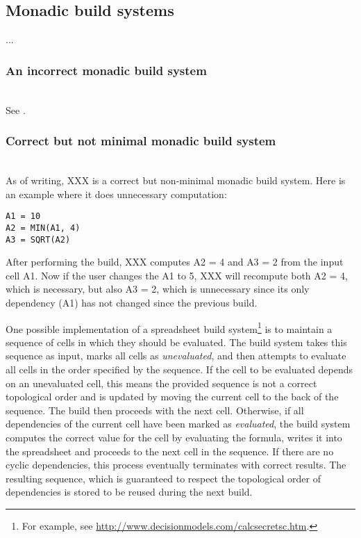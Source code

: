 

\subsection{Monadic build systems}

...
\subsubsection{An incorrect monadic build system}~\\

See .

\subsubsection{Correct but not minimal monadic build system}~\\

As of writing, XXX is a correct but non-minimal monadic build system. Here is
an example where it does unnecessary computation:

\begin{verbatim}
A1 = 10
A2 = MIN(A1, 4)
A3 = SQRT(A2)
\end{verbatim}

After performing the build, XXX computes \textsf{A2 = 4} and \textsf{A3 = 2}
from the input cell \textsf{A1}. Now if the user changes the \textsf{A1} to 5,
XXX will recompute both \textsf{A2 = 4}, which is necessary, but also
\textsf{A3 = 2}, which is unnecessary since its only dependency (\textsf{A1})
has not changed since the previous build.

One possible implementation of a spreadsheet build
system\footnote{For example, see \url{http://www.decisionmodels.com/calcsecretsc.htm}.}
is to maintain a
sequence of cells in which they should be evaluated. The build system takes this
sequence as input, marks all cells as \emph{unevaluated}, and then attempts to
evaluate all cells in the order specified by the sequence. If the cell to be
evaluated depends on an unevaluated cell, this means the provided sequence is
not a correct topological order and is updated by moving the current cell to the
back of the sequence. The build then proceeds with the next cell. Otherwise, if
all dependencies of the current cell have been marked as \emph{evaluated}, the
build system computes the correct value for the cell by evaluating the formula,
writes it into the spreadsheet and proceeds to the next cell in the sequence. If
there are no cyclic dependencies, this process eventually terminates with
correct results. The resulting sequence, which is guaranteed to respect the
topological order of dependencies is stored to be reused during the next build.

